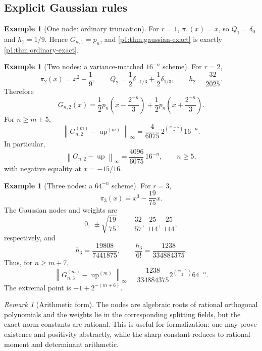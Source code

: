 \documentclass[11pt]{article}
\numberwithin{equation}{section}
\theoremstyle{definition}
\newtheorem{example}[theorem]{Example}
\theoremstyle{remark}
\newtheorem{remark}[theorem]{Remark}
\newcommand{\Up}{\operatorname{up}}
\newcommand{\norm}[1]{\left\lVert#1\right\rVert}
\begin{document}
\subsection{Explicit Gaussian rules}

\begin{example}[One node: ordinary truncation]
For $r=1$, $\pi_1(x)=x$, so $Q_1=\delta_0$ and $h_1=1/9$.  Hence $G_{n,1}=p_n$, and \cref{p1:thm:gaussian-exact} is exactly \cref{p1:thm:ordinary-exact}.
\end{example}

\begin{example}[Two nodes: a variance-matched $16^{-n}$ scheme]
For $r=2$,
\[
 \pi_2(x)=x^2-\frac19,
 \qquad
 Q_2=\frac12\delta_{-1/3}+\frac12\delta_{1/3},
 \qquad
 h_2=\frac{32}{2025}.
\]
Therefore
\begin{equation}
 \boxed{
 G_{n,2}(x)=\frac12p_n\!\left(x-\frac{2^{-n}}3\right)
 +\frac12p_n\!\left(x+\frac{2^{-n}}3\right).}
 \label{p1:eq:Gn2}
\end{equation}
For $n\ge m+5$,
\begin{equation}
 \boxed{
 \norm{G_{n,2}^{(m)}-\Up^{(m)}}_\infty
 =\frac4{6075}\,2^{\binom{m+5}{2}}16^{-n}.}
 \label{p1:eq:Gn2-error}
\end{equation}
In particular,
\begin{equation}
 \norm{G_{n,2}-\Up}_\infty
 =\frac{4096}{6075}\,16^{-n},
 \qquad n\ge5,
 \label{p1:eq:Gn2-uniform}
\end{equation}
with negative equality at $x=-15/16$.
\end{example}

\begin{example}[Three nodes: a $64^{-n}$ scheme]
For $r=3$,
\[
 \pi_3(x)=x^3-\frac{19}{75}x.
\]
The Gaussian nodes and weights are
\begin{equation}
 0,\ \pm\sqrt{\frac{19}{75}},
 \qquad
 \frac{32}{57},\ \frac{25}{114},\ \frac{25}{114},
 \label{p1:eq:G3-nodes-weights}
\end{equation}
respectively, and
\[
 h_3=\frac{19808}{7441875},
 \qquad
 \frac{h_3}{6!}=\frac{1238}{334884375}.
\]
Thus, for $n\ge m+7$,
\begin{equation}
 \boxed{
 \norm{G_{n,3}^{(m)}-\Up^{(m)}}_\infty
 =\frac{1238}{334884375}
 2^{\binom{m+7}{2}}64^{-n}.}
 \label{p1:eq:Gn3-error}
\end{equation}
The extremal point is $-1+2^{-(m+6)}$.
\end{example}

\begin{remark}[Arithmetic form]
The nodes are algebraic roots of rational orthogonal polynomials and the weights lie in the corresponding splitting fields, but the exact norm constants are rational.  This is useful for formalization: one may prove existence and positivity abstractly, while the sharp constant reduces to rational moment and determinant arithmetic.
\end{remark}
\end{document}

